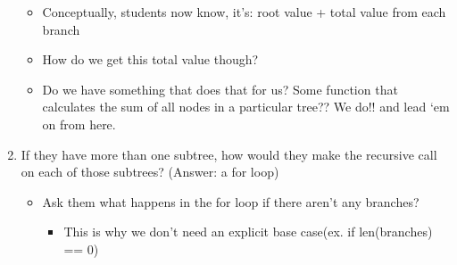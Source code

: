 \begin{blocksection}
\begin{guide}
\begin{enumerate}
\begin{itemize}
                \item Conceptually, students now know, it’s: root value + total value from each branch
                \item How do we get this total value though?
                \item Do we have something that does that for us? Some function that calculates the sum of all nodes in a particular tree?? We do!! and lead ‘em on from here.
            \end{itemize}
            \item If they have more than one subtree, how would they make the recursive call on each of those subtrees? (Answer: a for loop)
            \begin{itemize}
                \item Ask them what happens in the for loop if there aren’t any branches?
                \begin{itemize}
                    \item This is why we don’t need an explicit base case(ex. if len(branches) == 0)
                \end{itemize}
            \end{itemize}
	\end{enumerate}
	\end{guide}
\end{blocksection}